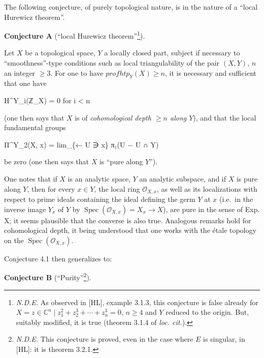 \documentclass[
]{article}
\newenvironment{Shaded}{}{}
\newcommand{\NormalTok}[1]{#1}
\begin{document}
The following conjecture, of purely topological nature, is in the nature
of a ``local Hurewicz theorem''.

\textbf{Conjecture A} (``local Hurewicz theorem''\footnote{\emph{N.D.E.}
  As observed in {[}HL{]}, example 3.1.3, this conjecture is false
  already for
  \(X = {z \in \mathbb{C}^{n} \mid z^{2}_{1} + z^{3}_{2} + \cdots + z^{3}_{n} = 0}\),
  \(n \geqslant 4\) and \(Y\) reduced to the origin. But, suitably
  modified, it is true (theorem 3.1.4 of \emph{loc. cit.}).}).

Let \(X\) be a topological space, \(Y\) a locally closed part, subject
if necessary to ``smoothness''-type conditions such as local
triangulability of the pair \((X, Y)\), \(n\) an integer
\(\geqslant 3\). For one to have \(prof htp_{Y}(X) \geqslant n\), it is
necessary and sufficient that one have

\begin{Shaded}
\begin{Highlighting}[]
\NormalTok{H\^{}Y\_i(ℤ\_X) = 0   for i \textless{} n}
\end{Highlighting}
\end{Shaded}

(one then says that \(X\) is of \emph{cohomological depth
\(\geqslant n\) along \(Y\)}), and that the local fundamental groups

\begin{Shaded}
\begin{Highlighting}[]
\NormalTok{Π\^{}Y\_2(X, x) = lim\_\{← U ∋ x\} π₁(U − U ∩ Y)}
\end{Highlighting}
\end{Shaded}

be zero (one then says that \(X\) is ``pure along \(Y\)'').

One notes that if \(X\) is an analytic space, \(Y\) an analytic
subspace, and if \(X\) is pure along \(Y\), then for every \(x \in Y\),
the local ring \(\mathcal{O}_{X,x}\), as well as its localizations with
respect to prime ideals containing the ideal defining the germ \(Y\) at
\(x\) (i.e.~in the inverse image \(Y_{x}\) of \(Y\) by
\(\operatorname{Spec}(\mathcal{O}_{X,x}) = X_{x} \to X\)), are pure in
the sense of Exp. X; it seems plausible that the converse is also true.
Analogous remarks hold for cohomological depth, it being understood that
one works with the étale topology on the
\(\operatorname{Spec}(\mathcal{O}_{X,x})\).

Conjecture 4.1 then generalizes to:

\textbf{Conjecture B} (``Purity''\footnote{\emph{N.D.E.} This conjecture
  is proved, even in the case where \(E\) is singular, in {[}HL{]}: it
  is theorem 3.2.1.}).
\end{document}
